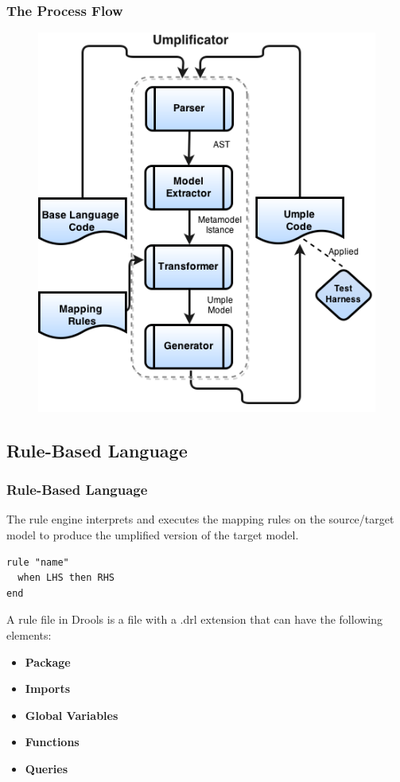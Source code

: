 \documentclass[xcolor=table]{beamer}
\begin{document}
\begin{frame}
\frametitle{The  Process Flow}
\centering
\begin{figure}
 \includegraphics[width=0.5\linewidth]{Figures/Umplificator_ProcessFlow.png}
\end{figure}
\end{frame}

\subsection{Rule-Based Language} 
\begin{frame}[fragile] 
\frametitle{Rule-Based Language}

The rule engine interprets and executes the mapping rules on the source/target model to produce the umplified version of the target model.

\begin{lstlisting}[style=DroolsStyle]
rule "name"
  when LHS then RHS
end
\end{lstlisting}

A rule file in Drools is a file with a .drl extension that can have the following elements:

\begin{itemize}
\item \textbf{Package}
\item \textbf{Imports}
\item \textbf{Global Variables}
\item \textbf{Functions}
\item \textbf{Queries}
\end{itemize}
\end{frame}
\end{document}
